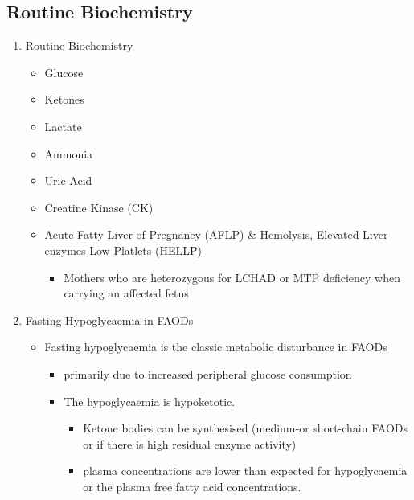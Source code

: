\documentclass{scrartcl}
\begin{document}
\subsection{Routine Biochemistry}
\label{sec:orgfcbf5af}
\begin{enumerate}
\item Routine Biochemistry
\label{sec:org25a16f7}
\begin{itemize}
\item Glucose
\item Ketones
\item Lactate
\item Ammonia
\item Uric Acid
\item Creatine Kinase (CK)
\item Acute Fatty Liver of Pregnancy (AFLP) \& Hemolysis, Elevated Liver enzymes Low Platlets (HELLP)
\begin{itemize}
\item Mothers who are heterozygous for LCHAD or MTP deficiency when
carrying an affected fetus
\end{itemize}
\end{itemize}
\item Fasting Hypoglycaemia  in FAODs
\label{sec:orgabbf9e8}
\begin{itemize}
\item Fasting hypoglycaemia is the classic metabolic disturbance in FAODs
\begin{itemize}
\item primarily due to increased peripheral glucose consumption
\end{itemize}
\begin{itemize}
\item The hypoglycaemia is hypoketotic.
\begin{itemize}
\item Ketone bodies can be synthesised (medium-or short-chain FAODs or
if there is high residual enzyme activity)
\item plasma concentrations are lower than expected for hypoglycaemia or
the plasma free fatty acid concentrations.
\end{itemize}
\end{itemize}
\end{itemize}


\end{enumerate}
\end{document}
